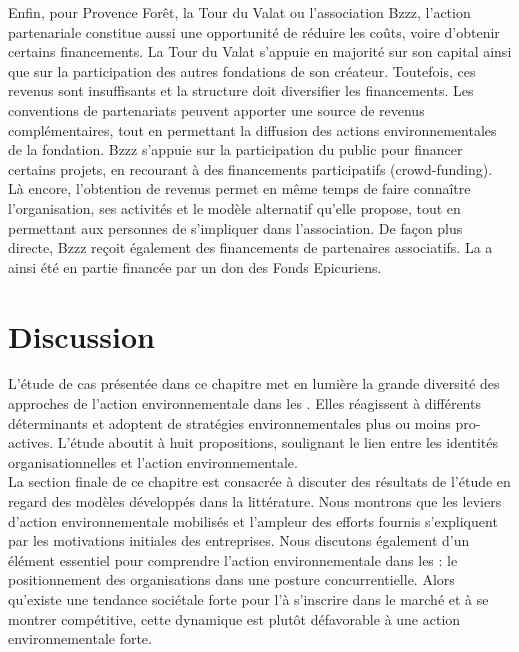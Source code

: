     Enfin, pour Provence Forêt, la Tour du Valat ou l'association Bzzz, l'action partenariale constitue aussi une opportunité de réduire les coûts, voire d'obtenir certains financements. La Tour du Valat s'appuie en majorité sur son capital ainsi que sur la participation des autres fondations de son créateur. Toutefois, ces revenus sont insuffisants et la structure doit diversifier les financements. Les conventions de partenariats peuvent apporter une source de revenus complémentaires, tout en permettant la diffusion des actions environnementales de la fondation. Bzzz s'appuie sur la participation du public pour financer certains projets, en recourant à des financements participatifs (crowd-funding). Là encore, l'obtention de revenus permet en même temps de faire connaître l'organisation, ses activités et le modèle alternatif qu'elle propose, tout en permettant aux personnes de s'impliquer dans l'association. De façon plus directe, Bzzz reçoit également des financements de partenaires associatifs. La  a ainsi été en partie financée par un don des Fonds Epicuriens.

\section{Discussion}


\label{section:conclu_quali}
    L'étude de cas présentée dans ce chapitre met en lumière la grande diversité des approches de l'action environnementale dans les \oess. Elles réagissent à différents déterminants et adoptent de stratégies environnementales plus ou moins pro-actives. L'étude aboutit à huit propositions, soulignant le lien entre les identités organisationnelles et l'action environnementale. \\

    La section finale de ce chapitre est consacrée à discuter des résultats de l'étude en regard des modèles développés dans la littérature. Nous montrons que les leviers d'action environnementale mobilisés et l'ampleur des efforts fournis s'expliquent par les motivations initiales des entreprises. Nous discutons également d'un élément essentiel pour comprendre l'action environnementale dans les \eess : le positionnement des organisations dans une posture concurrentielle. Alors qu'existe une tendance sociétale forte pour l'\ess à s'inscrire dans le marché et à se montrer compétitive, cette dynamique est plutôt défavorable à une action environnementale forte.


